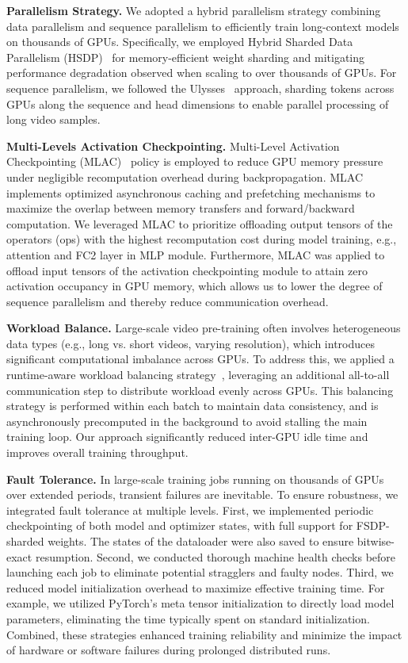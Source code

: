 \textbf{Parallelism Strategy.}
We adopted a hybrid parallelism strategy combining data parallelism and sequence parallelism to efficiently train long-context models on thousands of GPUs. Specifically, we employed Hybrid Sharded Data Parallelism (HSDP)~\citep{zhao2023pytorch} for memory-efficient weight sharding and mitigating performance degradation observed when scaling to over thousands of GPUs. 
For sequence parallelism, we followed the Ulysses~\citep{jacobs2023deepspeed} approach, sharding tokens across GPUs along the sequence and head dimensions to enable parallel processing of long video samples. 

\textbf{Multi-Levels Activation Checkpointing.}
Multi-Level Activation Checkpointing (MLAC)~\citep{seawead2025seaweed} policy is employed to reduce GPU memory pressure under negligible recomputation overhead during backpropagation. MLAC implements optimized asynchronous caching and prefetching mechanisms to maximize the overlap between memory transfers and forward/backward computation. We leveraged MLAC to prioritize offloading output tensors of the operators (ops) with the highest recomputation cost during model training, e.g., attention and FC2 layer in MLP module. Furthermore, MLAC was applied to offload input tensors of the activation checkpointing module to attain zero activation occupancy in GPU memory, which allows us to lower the degree of sequence parallelism and thereby reduce communication overhead.


\textbf{Workload Balance.}
Large-scale video pre-training often involves heterogeneous data types (e.g., long vs. short videos, varying resolution), which introduces significant computational imbalance across GPUs. To address this, we applied a runtime-aware workload balancing strategy~\citep{seawead2025seaweed}, leveraging an additional all-to-all communication step to distribute workload evenly across GPUs.  
This balancing strategy is performed within each batch to maintain data consistency, and is asynchronously precomputed in the background to avoid stalling the main training loop. 
Our approach significantly reduced inter-GPU idle time and improves overall training throughput.


\textbf{Fault Tolerance.}
In large-scale training jobs running on thousands of GPUs over extended periods, transient failures are inevitable. To ensure robustness, we integrated fault tolerance at multiple levels.
First, we implemented periodic checkpointing of both model and optimizer states, with full support for FSDP-sharded weights. The states of the dataloader were also saved to ensure bitwise-exact resumption.
Second, we conducted thorough machine health checks before launching each job to eliminate potential stragglers and faulty nodes.
Third, we reduced model initialization overhead to maximize effective training time. For example, we utilized PyTorch’s meta tensor initialization to directly load model parameters, eliminating the time typically spent on standard initialization.
Combined, these strategies enhanced training reliability and minimize the impact of hardware or software failures during prolonged distributed runs.

